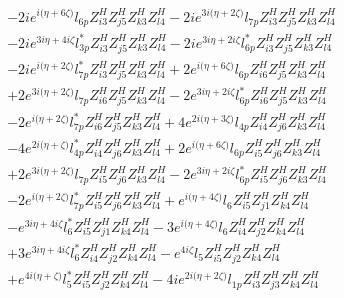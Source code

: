 \begin{align}
 &-2 i e^{i \Big(\eta +6 \zeta \Big)} l_{6p} Z_{{i 3}}^{H} Z_{{j 5}}^{H} Z_{{k 3}}^{H} Z_{{l 4}}^{H} -2 i e^{3 i \Big(\eta +2 \zeta \Big)} l_{7p} Z_{{i 3}}^{H} Z_{{j 5}}^{H} Z_{{k 3}}^{H} Z_{{l 4}}^{H} \nonumber \\ 
 &-2 i e^{3 i \eta +4 i \zeta } l_{3p}^* Z_{{i 3}}^{H} Z_{{j 5}}^{H} Z_{{k 3}}^{H} Z_{{l 4}}^{H} -2 i e^{3 i \eta +2 i \zeta } l_{6p}^* Z_{{i 3}}^{H} Z_{{j 5}}^{H} Z_{{k 3}}^{H} Z_{{l 4}}^{H} \nonumber \\ 
 &-2 i e^{i \Big(\eta +2 \zeta \Big)} l_{7p}^* Z_{{i 3}}^{H} Z_{{j 5}}^{H} Z_{{k 3}}^{H} Z_{{l 4}}^{H} +2 e^{i \Big(\eta +6 \zeta \Big)} l_{6p} Z_{{i 6}}^{H} Z_{{j 5}}^{H} Z_{{k 3}}^{H} Z_{{l 4}}^{H} \nonumber \\ 
 &+2 e^{3 i \Big(\eta +2 \zeta \Big)} l_{7p} Z_{{i 6}}^{H} Z_{{j 5}}^{H} Z_{{k 3}}^{H} Z_{{l 4}}^{H} -2 e^{3 i \eta +2 i \zeta } l_{6p}^* Z_{{i 6}}^{H} Z_{{j 5}}^{H} Z_{{k 3}}^{H} Z_{{l 4}}^{H} \nonumber \\ 
 &-2 e^{i \Big(\eta +2 \zeta \Big)} l_{7p}^* Z_{{i 6}}^{H} Z_{{j 5}}^{H} Z_{{k 3}}^{H} Z_{{l 4}}^{H} +4 e^{2 i \Big(\eta +3 \zeta \Big)} l_{4p} Z_{{i 4}}^{H} Z_{{j 6}}^{H} Z_{{k 3}}^{H} Z_{{l 4}}^{H} \nonumber \\ 
 &-4 e^{2 i \Big(\eta +\zeta \Big)} l_{4p}^* Z_{{i 4}}^{H} Z_{{j 6}}^{H} Z_{{k 3}}^{H} Z_{{l 4}}^{H} +2 e^{i \Big(\eta +6 \zeta \Big)} l_{6p} Z_{{i 5}}^{H} Z_{{j 6}}^{H} Z_{{k 3}}^{H} Z_{{l 4}}^{H} \nonumber \\ 
 &+2 e^{3 i \Big(\eta +2 \zeta \Big)} l_{7p} Z_{{i 5}}^{H} Z_{{j 6}}^{H} Z_{{k 3}}^{H} Z_{{l 4}}^{H} -2 e^{3 i \eta +2 i \zeta } l_{6p}^* Z_{{i 5}}^{H} Z_{{j 6}}^{H} Z_{{k 3}}^{H} Z_{{l 4}}^{H} \nonumber \\ 
 &-2 e^{i \Big(\eta +2 \zeta \Big)} l_{7p}^* Z_{{i 5}}^{H} Z_{{j 6}}^{H} Z_{{k 3}}^{H} Z_{{l 4}}^{H} +e^{i \Big(\eta +4 \zeta \Big)} l_6 Z_{{i 5}}^{H} Z_{{j 1}}^{H} Z_{{k 4}}^{H} Z_{{l 4}}^{H} \nonumber \\ 
 &- e^{3 i \eta +4 i \zeta } l_6^* Z_{{i 5}}^{H} Z_{{j 1}}^{H} Z_{{k 4}}^{H} Z_{{l 4}}^{H} -3 e^{i \Big(\eta +4 \zeta \Big)} l_6 Z_{{i 4}}^{H} Z_{{j 2}}^{H} Z_{{k 4}}^{H} Z_{{l 4}}^{H} \nonumber \\ 
 &+3 e^{3 i \eta +4 i \zeta } l_6^* Z_{{i 4}}^{H} Z_{{j 2}}^{H} Z_{{k 4}}^{H} Z_{{l 4}}^{H} - e^{4 i \zeta } l_5 Z_{{i 5}}^{H} Z_{{j 2}}^{H} Z_{{k 4}}^{H} Z_{{l 4}}^{H} \nonumber \\ 
 &+e^{4 i \Big(\eta +\zeta \Big)} l_5^* Z_{{i 5}}^{H} Z_{{j 2}}^{H} Z_{{k 4}}^{H} Z_{{l 4}}^{H} -4 i e^{2 i \Big(\eta +2 \zeta \Big)} l_{1p} Z_{{i 3}}^{H} Z_{{j 3}}^{H} Z_{{k 4}}^{H} Z_{{l 4}}^{H} \nonumber \\ 

\end{align}
